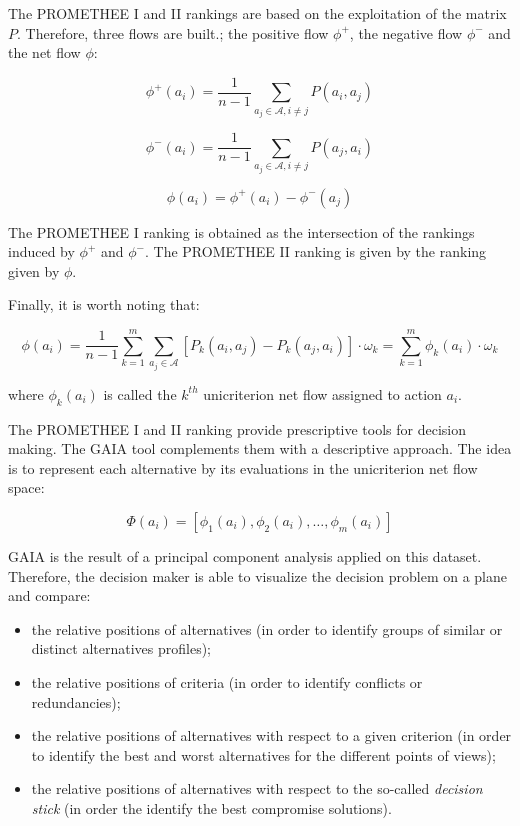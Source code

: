 \documentclass{svmult}
\begin{document}
The PROMETHEE I and II rankings are based on the exploitation of the matrix $P$. Therefore, three flows are built.; the positive flow $\phi^+$, the negative flow $\phi^-$ and the net flow $\phi$:

$$
\phi^+(a_i)= \frac{1}{n-1} \sum_{a_j \in \mathcal{A}, i \ne j}
P(a_i,a_j)
$$

$$
\phi^-(a_i)= \frac{1}{n-1} \sum_{a_j \in \mathcal{A}, i \ne j}
P(a_j,a_i)
$$

$$
\phi(a_i)=\phi^+(a_i)-\phi^-(a_j)
$$

The PROMETHEE I ranking is obtained as the intersection of the rankings induced by $\phi^+$ and $\phi^-$. The PROMETHEE II ranking is given by the ranking given by $\phi$.

Finally, it is worth noting that:

$$
\phi(a_i) = \frac{1}{n-1} \sum_{k=1}^{m} \sum_{a_j \in \mathcal{A}} {[P_k(a_i,a_j)-P_k(a_j,a_i)]} \cdot \omega_k = \sum_{k=1}^{m} \phi_k(a_i) \cdot \omega_k
$$

where $\phi_k(a_i)$ is called the $k^{th}$ unicriterion net flow assigned to action $a_i$.

The PROMETHEE I and II ranking provide prescriptive tools for decision making. The GAIA \cite{MarBra1988} tool complements them with a descriptive approach. The idea is to represent each alternative by its evaluations in the unicriterion net flow space:

$$
\Phi(a_i)=[\phi_1(a_i),\phi_2(a_i),\ldots,\phi_m(a_i)]
$$

GAIA is the result of a principal component analysis applied on this dataset. Therefore, the decision maker is able to visualize the decision problem on a plane and compare:
\begin{itemize}
\item the relative positions of alternatives (in order to identify groups of similar or distinct alternatives profiles);
\item the relative positions of criteria (in order to identify conflicts or redundancies);
\item the relative positions of alternatives with respect to a given criterion (in order to identify the best and worst alternatives for the different points of views);
\item the relative positions of alternatives with respect to the so-called \textit{decision stick} (in order the identify the best compromise solutions).
\end{itemize}
\end{document}
